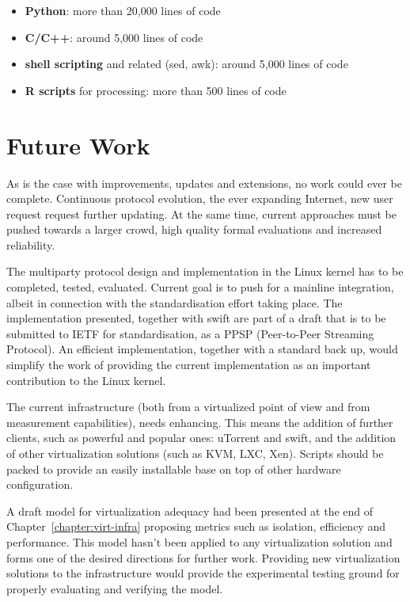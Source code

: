\begin{itemize}
  \item \textbf{Python}: more than 20,000 lines of code
  \item \textbf{C/C++}: around 5,000 lines of code
  \item \textbf{shell scripting} and related (sed, awk): around 5,000 lines
  of code
  \item \textbf{R scripts} for processing: more than 500 lines of code
\end{itemize}

\section{Future Work}
\label{sec:conclusion:future}

As is the case with improvements, updates and extensions, no work could ever
be complete. Continuous protocol evolution, the ever expanding Internet, new
user request request further updating. At the same time, current approaches
must be pushed towards a larger crowd, high quality formal evaluations and
increased reliability.

The multiparty protocol design and implementation in the Linux kernel has to
be completed, tested, evaluated. Current goal is to push for a mainline
integration, albeit in connection with the standardisation effort taking
place. The implementation presented, together with swift are part of a draft
that is to be submitted to IETF for standardisation, as a PPSP (Peer-to-Peer
Streaming Protocol). An efficient implementation, together with a standard
back up, would simplify the work of providing the current implementation as an
important contribution to the Linux kernel.

The current infrastructure (both from a virtualized point of view and from
measurement capabilities), needs enhancing. This means the addition of further
clients, such as powerful and popular ones: uTorrent and swift, and the
addition of other virtualization solutions (such as KVM, LXC, Xen). Scripts
should be packed to provide an easily installable base on top of other
hardware configuration.

A draft model for virtualization adequacy had been presented at the end of
Chapter~\ref{chapter:virt-infra} proposing metrics such as isolation,
efficiency and performance. This model hasn't been applied to any
virtualization solution and forms one of the desired directions for further
work. Providing new virtualization solutions to the infrastructure would
provide the experimental testing ground for properly evaluating and verifying
the model.

